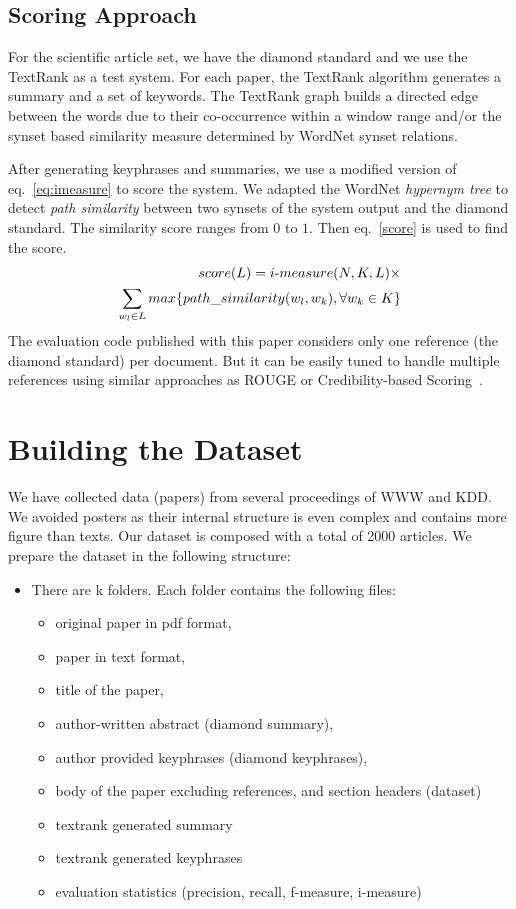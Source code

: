 \documentclass{sig-alternate-05-2015}
\begin{document}
\subsection{Scoring Approach}
For the scientific article set, we have the diamond standard and we use the TextRank as a test system. For each paper, the TextRank algorithm generates a summary and a set of keywords. The TextRank graph builds a directed edge between the words due to their co-occurrence within a window range and/or the synset based similarity measure determined by WordNet synset relations. 
\par After generating keyphrases and summaries, we use a modified version of eq.~\ref{eq:imeasure} to score the system. We adapted the WordNet \emph{hypernym tree} to detect \emph{path similarity} between two synsets of the system output and the diamond standard. The similarity score ranges from $0$ to $1$. Then eq.~\ref{score} is used to find the score. 
\begin{equation}
\begin{split}
score(L) = i\hbox{-}measure(N,K,L) \times \\
                 \sum_{w_l \in L} max \{path\_similarity(w_l, w_k), \forall w_k \in K\}
\end{split}
\label{score}
\end{equation}
The evaluation code published with this paper considers only one reference (the diamond standard) per document. But it can be easily tuned to handle multiple references using similar approaches as ROUGE or Credibility-based Scoring~\cite{DBLP:conf/ecir/HamidHT16}.
\section{Building the Dataset}
We have collected data (papers) from several proceedings of WWW and KDD. We avoided posters as their internal structure is even complex and contains more figure than texts. Our dataset is composed with a total of 2000 articles. We prepare the dataset in the following structure: 
\begin{itemize}[noitemsep, nolistsep]
\item There are k folders. Each folder contains the following files: 

\begin{itemize}[noitemsep, nolistsep]
\item original paper in pdf format, 
\item paper in text format,  
\item title of the paper,
\item author-written abstract (diamond summary),
\item author provided keyphrases (diamond keyphrases),
\item body of the paper excluding references, and section headers (dataset)
\item textrank generated summary 
\item textrank generated keyphrases 
\item evaluation statistics (precision, recall, f-measure, i-measure)
\end{itemize}
\end{itemize}


\end{document}
